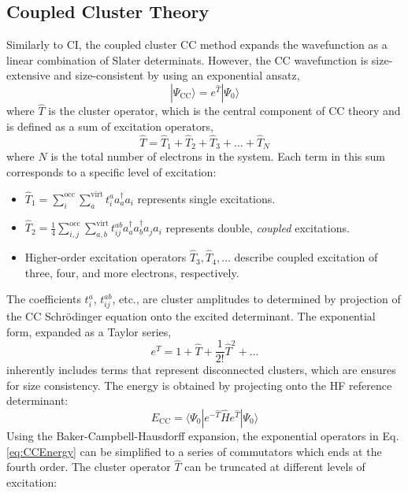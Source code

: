 \subsection{Coupled Cluster Theory} \label{sec:CCTheory}
Similarly to CI, the coupled cluster CC method expands the wavefunction as a linear combination of Slater determinats. However, the CC wavefunction is size-extensive and size-consistent by using an exponential ansatz,
\begin{equation}\label{eq:CCWavenfunc}
    | \Psi_{\mathrm{CC}} \rangle = e^{\hat{T}} | \Psi_{0} \rangle
\end{equation}
where $\hat{T}$ is the cluster operator, which is the central component of CC theory and is defined as a sum of excitation operators,
\begin{equation}
    \hat{T} = \hat{T}_1 + \hat{T}_2 + \hat{T}_3 + \dots + \hat{T}_N
\end{equation}
where $N$ is the total number of electrons in the system. Each term in this sum corresponds to a specific level of excitation:
\begin{itemize}
    \item $\hat{T}_1 = \sum_{i}^{\text{occ}} \sum_{a}^{\text{virt}} t_i^a a_a^{\dagger} a_i$ represents single excitations.
    \item $\hat{T}_2 = \frac{1}{4} \sum_{i,j}^{\text{occ}} \sum_{a,b}^{\text{virt}} t_{ij}^{ab} a_a^{\dagger} a_b^{\dagger} a_j a_i$ represents double, \textit{coupled} excitations.
    \item Higher-order excitation operators $\hat{T}_3, \hat{T}_4, \dots$ describe coupled excitation of three, four, and more electrons, respectively.
\end{itemize}
The coefficients $t_i^a$, $t_{ij}^{ab}$, etc., are cluster amplitudes to determined by projection of the CC Schr\"{o}dinger equation onto the excited determinant. The exponential form, expanded as a Taylor series,
\begin{equation}
    e^{\hat{T}} = 1 + \hat{T} + \frac{1}{2!} \hat{T}^2 + \dots
\end{equation}
inherently includes terms that represent disconnected clusters, which are ensures for size consistency. The energy is obtained by projecting onto the HF reference determinant:
\begin{equation}\label{eq:CCEnergy}
    E_{\mathrm{CC}}=\langle \Psi_{0} | e^{-\hat{T}} \hat{H} e^{\hat{T}} | \Psi_{0} \rangle
\end{equation}
Using the Baker-Campbell-Hausdorff expansion, the exponential operators in Eq. \ref{eq:CCEnergy} can be simplified to a series of commutators which ends at the fourth order. The cluster operator $\hat{T}$ can be truncated at different levels of excitation:
